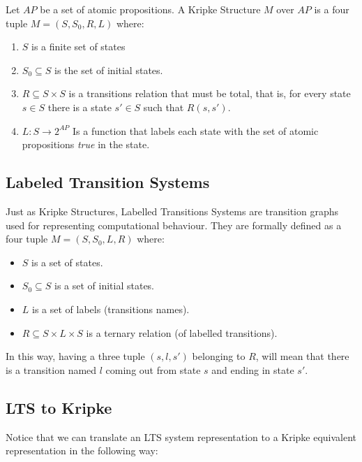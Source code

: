 \documentclass[12pt]{article}
\begin{document}
Let $AP$ be a set of atomic propositions. A Kripke Structure $M$ over $AP$ is a four tuple $M=(S,S_0,R,L)$ where:
\begin{enumerate}
\item $S$ is a finite set of states
\item $S_0 \subseteq S$ is the set of initial states.
\item $R \subseteq S \times S$ is a transitions relation that must be total, that is, for every state $s \in S$ there is a state $s' \in S$ such that $R(s,s')$.
\item $L : S \rightarrow 2^{AP}$ Is a function that labels each state with the set of atomic propositions \textit{true} in the state.
\end{enumerate}


\subsection{Labeled Transition Systems}\label{lts}
Just as Kripke Structures, Labelled Transitions Systems are transition graphs used for representing computational behaviour. They are formally defined as a four tuple $M = (S,S_{0},L,R)$ where:
\begin{itemize}
\item $S$ is a set of states.
\item $S_0 \subseteq S$ is a set of initial states.
\item $L$ is a set of labels (transitions names).
\item $R \subseteq S \times L \times S$ is a ternary relation (of labelled transitions).
\end{itemize}
In this way, having a three tuple $(s,l,s')$ belonging to $R$, will mean that there is a transition named $l$ coming out from state $s$ and ending in state $s'$.

\subsection{LTS to Kripke}\label{lts2kripke}
Notice that we can translate an LTS system representation to a Kripke equivalent representation in the following way:\\
\end{document}
